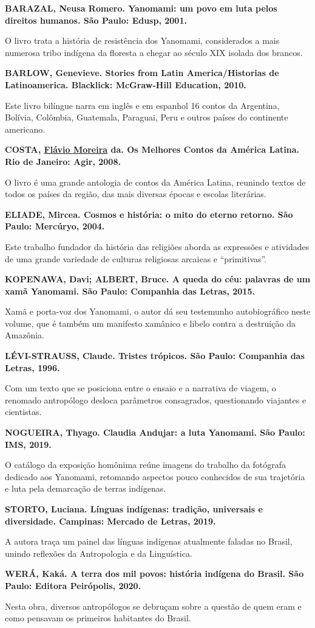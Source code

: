 \documentclass[12pt]{extarticle}
\begin{document}
\textbf{BARAZAL, Neusa Romero. Yanomami: um povo em luta pelos direitos
humanos. São Paulo: Edusp, 2001.}

O livro trata a história de resistência dos Yanomami, considerados a
mais numerosa tribo indígena da floresta a chegar ao século XIX isolada
dos brancos.

\textbf{BARLOW, Genevieve. Stories from Latin America/Historias de
Latinoamerica. Blacklick: McGraw-Hill Education, 2010.}

Este livro bilíngue narra em inglês e em espanhol 16 contos da
Argentina, Bolívia, Colômbia, Guatemala, Paraguai, Peru e outros países
do continente americano.

\textbf{COSTA,
\href{https://www.estantevirtual.com.br/livros/flavio-moreira-da-costa?busca_es=1}{Flávio
Moreira} da. Os Melhores Contos da América Latina. Rio de Janeiro: Agir,
2008.}

O livro é uma grande antologia de contos da América Latina, reunindo
textos de todos os países da região, das mais diversas épocas e escolas
literárias.

\textbf{ELIADE, Mircea. Cosmos e história: o mito do eterno retorno. São
Paulo: Mercúryo, 2004.}

Este trabalho fundador da história das religiões aborda as expressões e
atividades de uma grande variedade de culturas religiosas arcaicas e
``primitivas''.

\textbf{KOPENAWA, Davi; ALBERT, Bruce. A queda do céu: palavras de um
xamã Yanomami. São Paulo: Companhia das Letras, 2015.}

Xamã e porta-voz dos Yanomami, o autor dá seu testemunho autobiográfico
neste volume, que é também um manifesto xamânico e libelo contra a
destruição da Amazônia.

\textbf{LÉVI-STRAUSS, Claude. Tristes trópicos. São Paulo: Companhia das
Letras, 1996.}

Com um texto que se posiciona entre o ensaio e a narrativa de viagem, o
renomado antropólogo desloca parâmetros consagrados, questionando
viajantes e cientistas.

\textbf{NOGUEIRA, Thyago. Claudia Andujar: a luta Yanomami. São Paulo:
IMS, 2019.}

O catálogo da exposição homônima reúne imagens do trabalho da fotógrafa
dedicado aos Yanomami, retomando aspectos pouco conhecidos de sua
trajetória e luta pela demarcação de terras indígenas.

\textbf{STORTO, Luciana. Línguas indígenas: tradição, universais e
diversidade. Campinas: Mercado de Letras, 2019.}

A autora traça um painel das línguas indígenas atualmente faladas no
Brasil, unindo reflexões da Antropologia e da Linguística.

\textbf{WERÁ, Kaká. A terra dos mil povos: história indígena do Brasil.
São Paulo: Editora Peirópolis, 2020.}

Nesta obra, diversos antropólogos se debruçam sobre a questão de quem
eram e como pensavam os primeiros habitantes do Brasil.
\end{document}

